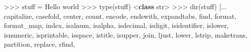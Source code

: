 \documentclass[10pt,]{book}
\newenvironment{Shaded}{}{}
\newcommand{\BuiltInTok}[1]{\textcolor[rgb]{0.00,0.50,0.00}{#1}}
\newcommand{\KeywordTok}[1]{\textcolor[rgb]{0.00,0.44,0.13}{\textbf{#1}}}
\newcommand{\NormalTok}[1]{#1}
\newcommand{\OperatorTok}[1]{\textcolor[rgb]{0.40,0.40,0.40}{#1}}
\newcommand{\StringTok}[1]{\textcolor[rgb]{0.25,0.44,0.63}{#1}}
\begin{document}
\begin{Shaded}
\begin{Highlighting}[]
\OperatorTok{\textgreater{}\textgreater{}\textgreater{}}\NormalTok{ stuff }\OperatorTok{=} \StringTok{\textquotesingle{}Hello world\textquotesingle{}}
\OperatorTok{\textgreater{}\textgreater{}\textgreater{}} \BuiltInTok{type}\NormalTok{(stuff)}
\OperatorTok{\textless{}}\KeywordTok{class} \StringTok{\textquotesingle{}str\textquotesingle{}}\OperatorTok{\textgreater{}}
\OperatorTok{\textgreater{}\textgreater{}\textgreater{}} \BuiltInTok{dir}\NormalTok{(stuff)}
\NormalTok{[... }\StringTok{\textquotesingle{}capitalize\textquotesingle{}}\NormalTok{, }\StringTok{\textquotesingle{}casefold\textquotesingle{}}\NormalTok{, }\StringTok{\textquotesingle{}center\textquotesingle{}}\NormalTok{, }\StringTok{\textquotesingle{}count\textquotesingle{}}\NormalTok{, }\StringTok{\textquotesingle{}encode\textquotesingle{}}\NormalTok{,}
\StringTok{\textquotesingle{}endswith\textquotesingle{}}\NormalTok{, }\StringTok{\textquotesingle{}expandtabs\textquotesingle{}}\NormalTok{, }\StringTok{\textquotesingle{}find\textquotesingle{}}\NormalTok{, }\StringTok{\textquotesingle{}format\textquotesingle{}}\NormalTok{, }\StringTok{\textquotesingle{}format\_map\textquotesingle{}}\NormalTok{,}
\StringTok{\textquotesingle{}index\textquotesingle{}}\NormalTok{, }\StringTok{\textquotesingle{}isalnum\textquotesingle{}}\NormalTok{, }\StringTok{\textquotesingle{}isalpha\textquotesingle{}}\NormalTok{, }\StringTok{\textquotesingle{}isdecimal\textquotesingle{}}\NormalTok{, }\StringTok{\textquotesingle{}isdigit\textquotesingle{}}\NormalTok{,}
\StringTok{\textquotesingle{}isidentifier\textquotesingle{}}\NormalTok{, }\StringTok{\textquotesingle{}islower\textquotesingle{}}\NormalTok{, }\StringTok{\textquotesingle{}isnumeric\textquotesingle{}}\NormalTok{, }\StringTok{\textquotesingle{}isprintable\textquotesingle{}}\NormalTok{,}
\StringTok{\textquotesingle{}isspace\textquotesingle{}}\NormalTok{, }\StringTok{\textquotesingle{}istitle\textquotesingle{}}\NormalTok{, }\StringTok{\textquotesingle{}isupper\textquotesingle{}}\NormalTok{, }\StringTok{\textquotesingle{}join\textquotesingle{}}\NormalTok{, }\StringTok{\textquotesingle{}ljust\textquotesingle{}}\NormalTok{, }\StringTok{\textquotesingle{}lower\textquotesingle{}}\NormalTok{,}
\StringTok{\textquotesingle{}lstrip\textquotesingle{}}\NormalTok{, }\StringTok{\textquotesingle{}maketrans\textquotesingle{}}\NormalTok{, }\StringTok{\textquotesingle{}partition\textquotesingle{}}\NormalTok{, }\StringTok{\textquotesingle{}replace\textquotesingle{}}\NormalTok{, }\StringTok{\textquotesingle{}rfind\textquotesingle{}}\NormalTok{,}

\end{Highlighting}
\end{Shaded}
\end{document}
